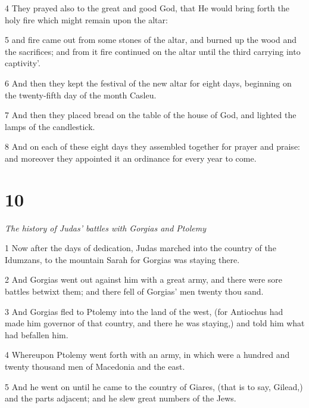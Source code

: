 \par 4 They prayed also to the great and good God, that He would bring forth the holy fire which might remain upon the altar: 

\par 5 and fire came out from some stones of the altar, and burned up the wood and the sacrifices; and from it fire continued on the altar until the third carrying into captivity’. 

\par 6 And then they kept the festival of the new altar for eight days, beginning on the twenty-fifth day of the month Casleu. 

\par 7 And then they placed bread on the table of the house of God, and lighted the lamps of the candlestick. 

\par 8 And on each of these eight days they assembled together for prayer and praise: and moreover they appointed it an ordinance for every year to come. 

\chapter{10}

\par \textit{The history of Judas’ battles with Gorgias and Ptolemy}

\par 1 Now after the days of dedication, Judas marched into the country of the Idumzans, to the mountain Sarah for Gorgias was staying there. 

\par 2 And Gorgias went out against him with a great army, and there were sore battles betwixt them; and there fell of Gorgias’ men twenty thou sand. 

\par 3 And Gorgias fled to Ptolemy into the land of the west, (for Antiochus had made him governor of that country, and there he was staying,) and told him what had befallen him. 

\par 4 Whereupon Ptolemy went forth with an army, in which were a hundred and twenty thousand men of Macedonia and the east. 

\par 5 And he went on until he came to the country of Giares, (that is to say, Gilead,) and the parts adjacent; and he slew great numbers of the Jews. 

